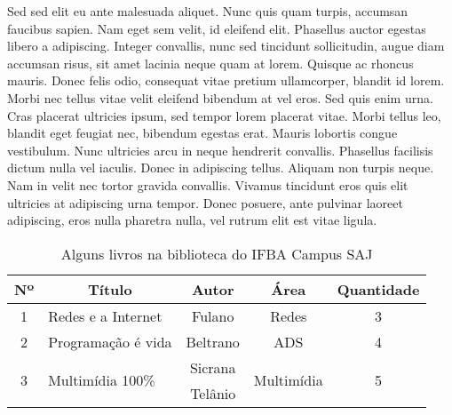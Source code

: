 \documentclass[tec, ads, scr, classic, a4paper,twoside]{ifbatcc}
\begin{document}
Sed sed elit eu ante malesuada aliquet. Nunc quis quam turpis, accumsan faucibus sapien. Nam eget sem velit, id eleifend elit. Phasellus auctor egestas libero a adipiscing. Integer convallis, nunc sed tincidunt sollicitudin, augue diam accumsan risus, sit amet lacinia neque quam at lorem. Quisque ac rhoncus mauris. Donec felis odio, consequat vitae pretium ullamcorper, blandit id lorem. Morbi nec tellus vitae velit eleifend bibendum at vel eros. Sed quis enim urna. Cras placerat ultricies ipsum, sed tempor lorem placerat vitae. Morbi tellus leo, blandit eget feugiat nec, bibendum egestas erat. Mauris lobortis congue vestibulum. Nunc ultricies arcu in neque hendrerit convallis. Phasellus facilisis dictum nulla vel iaculis. Donec in adipiscing tellus. Aliquam non turpis neque. Nam in velit nec tortor gravida convallis. Vivamus tincidunt eros quis elit ultricies at adipiscing urna tempor. Donec posuere, ante pulvinar laoreet adipiscing, eros nulla pharetra nulla, vel rutrum elit est vitae ligula.

\begin{table}[h]
\begin{center}
\caption{Alguns livros na biblioteca do IFBA Campus SAJ}
\label{tabela:livros}
\begin{adjustbox}{max width=\textwidth}
\begin{tabular}{clccc}
\toprule
\textbf{Nº} & \multicolumn{1}{c}{\textbf{Título}} & \textbf{Autor} & \textbf{Área} & \textbf{Quantidade} \\ 
\toprule 
                   1   & Redes e a Internet                 & Fulano         & Redes                          & 3                  \\ \midrule
                   2   & Programação é vida                 & Beltrano       & ADS                            & 4                  \\ \midrule
  \multirow{2}{*}{3}   & \multirow{2}{*}{Multimídia 100\%}  & Sicrana        & \multirow{2}{*}{Multimídia}    & \multirow{2}{*}{5} \\ 
                       &                                    & Telânio        &                                & \\   
\bottomrule
\end{tabular}
\end{adjustbox}
\end{center}
\end{table}
\end{document}
